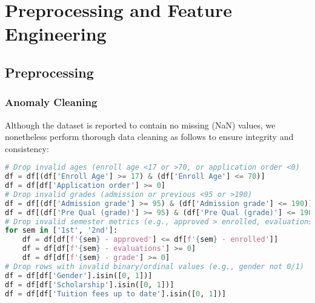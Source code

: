 \documentclass[twoside,final]{hcmut-report}
\begin{document}
\section{Preprocessing and Feature Engineering}
\subsection{Preprocessing}
\subsubsection*{Anomaly Cleaning}
Although the dataset is reported to contain no missing (NaN) values, we nonetheless perform thorough data cleaning as follows to ensure integrity and consistency:
\begin{lstlisting}[language=python]
# Drop invalid ages (enroll age <17 or >70, or application order <0)
df = df[(df['Enroll Age'] >= 17) & (df['Enroll Age'] <= 70)]
df = df[df['Application order'] >= 0]
# Drop invalid grades (admission or previous <95 or >190)
df = df[(df['Admission grade'] >= 95) & (df['Admission grade'] <= 190)]
df = df[(df['Pre Qual (grade)'] >= 95) & (df['Pre Qual (grade)'] <= 190)]
# Drop invalid semester metrics (e.g., approved > enrolled, evaluations <0)
for sem in ['1st', '2nd']:
    df = df[df[f'{sem} - approved'] <= df[f'{sem} - enrolled']]
    df = df[df[f'{sem} - evaluations'] >= 0]
    df = df[df[f'{sem} - grade'] >= 0]
# Drop rows with invalid binary/ordinal values (e.g., gender not 0/1)
df = df[df['Gender'].isin([0, 1])]
df = df[df['Scholarship'].isin([0, 1])]
df = df[df['Tuition fees up to date'].isin([0, 1])]
\end{lstlisting}
\end{document}
